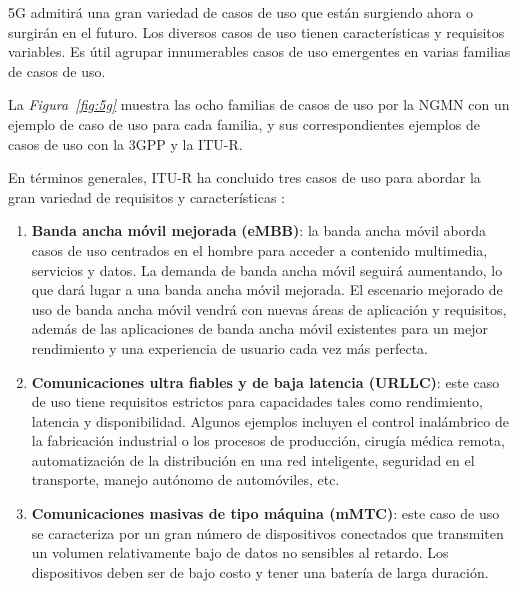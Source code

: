 5G admitirá una gran variedad de casos de uso que están surgiendo ahora o surgirán en el futuro. Los diversos casos de uso tienen características y requisitos variables. Es útil agrupar innumerables casos de uso emergentes en varias familias de casos de uso. \newline

La \textit{Figura~\ref{fig:5g}} muestra las ocho familias de casos de uso por la NGMN con un ejemplo de caso de uso para cada familia, y sus correspondientes ejemplos de casos de uso con la 3GPP y la ITU-R.\newline

En términos generales, ITU-R ha concluido tres casos de uso para abordar la gran variedad de requisitos y características \parencite{5gMobileComms}:


\begin{enumerate}
    \item \textbf{Banda ancha móvil mejorada} \textbf{(eMBB)}: la banda ancha móvil aborda casos de uso centrados en el hombre para acceder a contenido multimedia, servicios y datos. La demanda de banda ancha móvil seguirá aumentando, lo que dará lugar a una banda ancha móvil mejorada. El escenario mejorado de uso de banda ancha móvil vendrá con nuevas áreas de aplicación y requisitos, además de las aplicaciones de banda ancha móvil existentes para un mejor rendimiento y una experiencia de usuario cada vez más perfecta.
    \item \textbf{Comunicaciones ultra fiables y de baja latencia (URLLC)}: este caso de uso tiene requisitos estrictos para capacidades tales como rendimiento, latencia y disponibilidad. Algunos ejemplos incluyen el control inalámbrico de la fabricación industrial o los procesos de producción, cirugía médica remota, automatización de la distribución en una red inteligente, seguridad en el transporte, manejo autónomo de automóviles, etc.
    \item \textbf{Comunicaciones masivas de tipo máquina (mMTC)}: este caso de uso se caracteriza por un gran número de dispositivos conectados que transmiten un volumen relativamente bajo de datos no sensibles al retardo. Los dispositivos deben ser de bajo costo y tener una batería de larga duración.
\end{enumerate}




